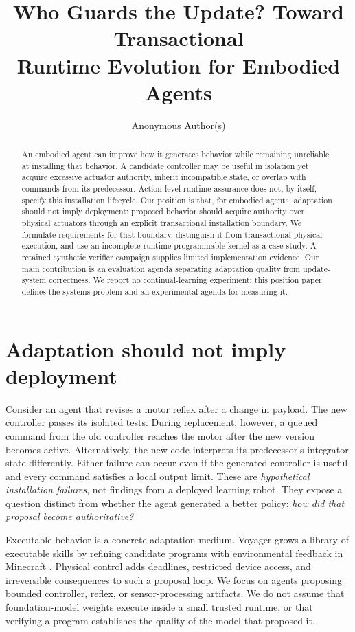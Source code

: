 \documentclass{article}
\title{Who Guards the Update? Toward Transactional\protect\\ Runtime Evolution for Embodied Agents}
\author{Anonymous Author(s)}
\begin{document}
\maketitle

\begin{abstract}
An embodied agent can improve how it generates behavior while remaining unreliable at installing that behavior. A candidate controller may be useful in isolation yet acquire excessive actuator authority, inherit incompatible state, or overlap with commands from its predecessor. Action-level runtime assurance does not, by itself, specify this installation lifecycle. Our position is that, for embodied agents, adaptation should not imply deployment: proposed behavior should acquire authority over physical actuators through an explicit transactional installation boundary. We formulate requirements for that boundary, distinguish it from transactional physical execution, and use an incomplete runtime-programmable kernel as a case study. A retained synthetic verifier campaign supplies limited implementation evidence. Our main contribution is an evaluation agenda separating adaptation quality from update-system correctness. We report no continual-learning experiment; this position paper defines the systems problem and an experimental agenda for measuring it.
\end{abstract}

\section{Adaptation should not imply deployment}
\label{sec:position}
Consider an agent that revises a motor reflex after a change in payload. The new controller passes its isolated tests. During replacement, however, a queued command from the old controller reaches the motor after the new version becomes active. Alternatively, the new code interprets its predecessor's integrator state differently. Either failure can occur even if the generated controller is useful and every command satisfies a local output limit. These are \emph{hypothetical installation failures}, not findings from a deployed learning robot. They expose a question distinct from whether the agent generated a better policy: \emph{how did that proposal become authoritative?}

Executable behavior is a concrete adaptation medium. Voyager grows a library of executable skills by refining candidate programs with environmental feedback in Minecraft \citep{wang2023voyager}. Physical control adds deadlines, restricted device access, and irreversible consequences to such a proposal loop. We focus on agents proposing bounded controller, reflex, or sensor-processing artifacts. We do not assume that foundation-model weights execute inside a small trusted runtime, or that verifying a program establishes the quality of the model that proposed it.
\end{document}
